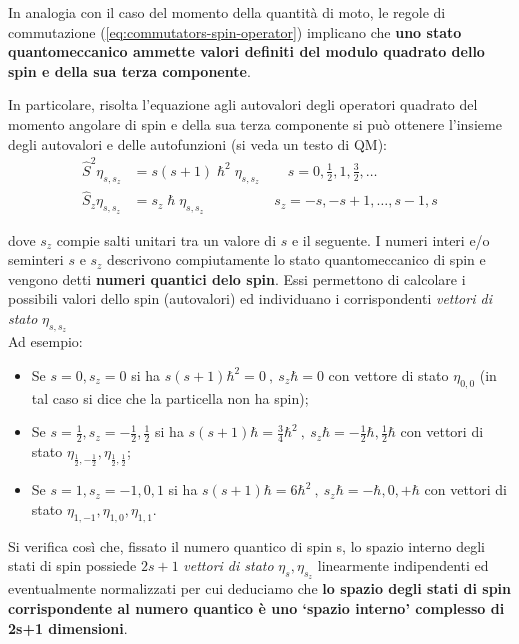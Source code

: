 In analogia con il caso del momento della quantità di moto, le regole di
commutazione (\ref{eq:commutators-spin-operator}) implicano che \textbf{uno stato
quantomeccanico ammette valori definiti del modulo quadrato dello spin e
della sua terza componente}.

In particolare, risolta l'equazione agli autovalori degli operatori
quadrato del momento angolare di spin e della sua terza componente si
può ottenere l'insieme degli autovalori e delle autofunzioni (si veda un testo di QM):
\begin{equation}
    \begin{aligned}
        \hat{S}^{2} \eta_{s,s_{z}} &= s (s+1) \hslash^{2} \eta_{s,s_{z}} \qquad s = 0, \frac{1}{2}, 1, \frac{3}{2}, \dots \\
        \hat{S}_{z} \eta_{s,s_{z}} &= s_{z} \hslash \eta_{s,s_{z}} \qquad \qquad \quad s_{z} = -s, -s+1, \dots , s-1, s
    \end{aligned}
    \label{eq:eigenvalue-eq-spin}
\end{equation}

dove \(s_{z}\) compie salti unitari tra un valore di \(s\) e il
seguente.
I numeri interi e/o seminteri $s$ e $s_{z}$ descrivono compiutamente lo stato quantomeccanico di spin e vengono detti \textbf{numeri quantici delo spin}.
Essi permettono di calcolare i possibili valori dello spin (autovalori) ed individuano i corrispondenti \emph{vettori di stato} $\eta_{s,s_{z}}$ \\
Ad esempio:
\begin{itemize}
    \item Se $s = 0,s_{z}=0$ si ha $s(s+1) \hbar^{2} = 0 \ , \ s_{z}\hbar = 0$ con vettore di stato $\eta_{0,0}$ (in tal caso si dice che la particella non ha spin);
    \item Se $s=\frac{1}{2}, s_{z} = -\frac{1}{2}, \frac{1}{2}$ si ha $s(s+1)\hbar = \frac{3}{4} \hbar^{2} \ , \ s_{z}\hbar = -\frac{1}{2}\hbar, \frac{1}{2} \hbar$ con vettori di stato $\eta_{\frac{1}{2} , - \frac{1}{2}} , \eta_{\frac{1}{2}, \frac{1}{2}}$;
    \item Se $s=1 , s_{z} = -1,0,1$ si ha $s(s+1)\hbar = 6\hbar^{2} \ , \ s_{z}\hbar = - \hbar,0, +\hbar$ con vettori di stato $\eta_{1,-1}, \eta_{1,0},\eta_{1,1}$.
\end{itemize}
Si verifica così che, fissato il numero quantico di spin s, lo spazio interno degli stati di spin possiede
$2s+1$ \emph{vettori di stato} $\eta_{s},\eta_{s_{z}}$ linearmente indipendenti ed eventualmente normalizzati per cui deduciamo che \textbf{lo spazio degli stati di spin corrispondente al numero quantico  è uno ‘spazio interno’ complesso di 2s+1 dimensioni}.
\bigskip

